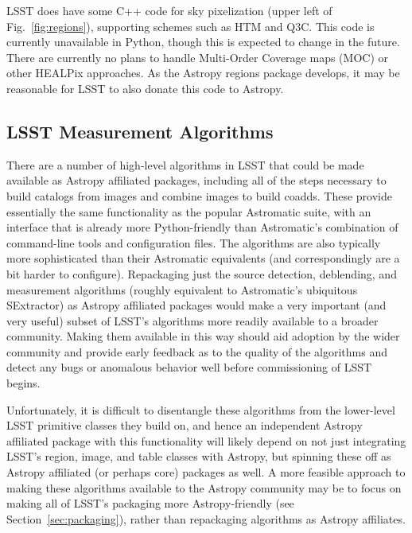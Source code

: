 \documentclass[]{spie}  %
\begin{document}
LSST does have some C++ code for sky pixelization (upper left of Fig.~\ref{fig:regions}), supporting schemes such as HTM\cite{2001misk.conf..631K} and Q3C\cite{2006ASPC..351..735K}.
This code is currently unavailable in Python, though this is expected to change in the future.
There are currently no plans to handle Multi-Order Coverage maps (MOC)\cite{2012ASPC..461..347F,2014ivoa.spec.0602F} or other HEALPix approaches\cite{2015A&A...580A.132R}.
As the Astropy regions package develops, it may be reasonable for LSST to also donate this code to Astropy.

\subsection{LSST Measurement Algorithms}

There are a number of high-level algorithms in LSST that could be made available as Astropy affiliated packages\cite{bosch_2016_48435}, including all of the steps necessary to build catalogs from images and combine images to build coadds.
These provide essentially the same functionality as the popular Astromatic suite\cite{2012ASSP...29...71B}, with an interface that is already more Python-friendly than Astromatic's combination of command-line tools and configuration files.
The algorithms are also typically more sophisticated than their Astromatic equivalents (and correspondingly are a bit harder to configure).
Repackaging just the source detection, deblending, and measurement algorithms (roughly equivalent to Astromatic's ubiquitous SExtractor) as Astropy affiliated packages would make a very important (and very useful) subset of LSST's algorithms more readily available to a broader community.
Making them available in this way should aid adoption by the wider community and provide early feedback as to the quality of the algorithms and detect any bugs or anomalous behavior well before commissioning of LSST begins.

Unfortunately, it is difficult to disentangle these algorithms from the lower-level LSST primitive classes they build on, and hence an independent Astropy affiliated package with this functionality will likely depend on not just integrating LSST's region, image, and table classes with Astropy, but spinning these off as Astropy affiliated (or perhaps core) packages as well.
A more feasible approach to making these algorithms available to the Astropy community may be to focus on making all of LSST's packaging more Astropy-friendly (see Section~\ref{sec:packaging}), rather than repackaging algorithms as Astropy affiliates.
\end{document}
